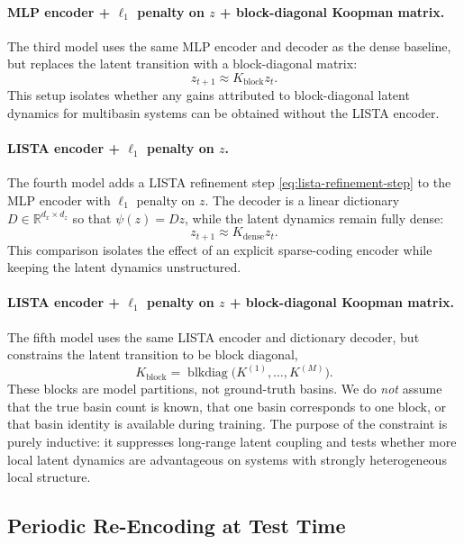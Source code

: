 \paragraph{MLP encoder + $\ell_1$ penalty on $z$ + block-diagonal Koopman matrix.}
The third model uses the same MLP encoder and decoder as the dense baseline, but replaces the latent transition with a block-diagonal matrix:
\begin{equation}
    z_{t+1} \approx K_{\mathrm{block}} z_t .
\end{equation}
This setup isolates whether any gains attributed to block-diagonal latent dynamics for multibasin systems can be obtained without the LISTA encoder.

\paragraph{LISTA encoder + $\ell_1$ penalty on $z$.}
The fourth model adds a LISTA refinement step \eqref{eq:lista-refinement-step} to the MLP encoder with $\ell_1$ penalty on $z$. The decoder is a linear dictionary $D \in \mathbb{R}^{d_x \times d_z}$ so that $\psi(z) = Dz$, while the latent dynamics remain fully dense:
\begin{equation}
    z_{t+1} \approx K_{\mathrm{dense}} z_t.
\end{equation}
This comparison isolates the effect of an explicit sparse-coding encoder while keeping the latent dynamics unstructured.

\paragraph{LISTA encoder + $\ell_1$ penalty on $z$ + block-diagonal Koopman matrix.}
The fifth model uses the same LISTA encoder and dictionary decoder, but constrains the latent transition to be block diagonal,
\begin{equation}
    K_{\mathrm{block}}
    =
    \operatorname{blkdiag}\!\big(K^{(1)}, \dots, K^{(M)}\big).
\end{equation}
These blocks are model partitions, not ground-truth basins. 
We do \emph{not} assume that the true basin count is known, that one basin corresponds to one block, or that basin identity is available during training. The purpose of the constraint is purely inductive: it suppresses long-range latent coupling and tests whether more local latent dynamics are advantageous on systems with strongly heterogeneous local structure.

\subsection{Periodic Re-Encoding at Test Time}

